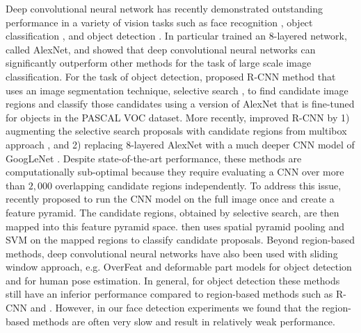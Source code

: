 \documentclass{sig-alternate-2013}
\begin{document}
Deep convolutional neural network has recently demonstrated outstanding performance in a variety of vision tasks such as face recognition \cite{deepface, deepid2}, object classification \cite{alex-net, googlenet}, and object detection \cite{rcnn, overfeat, spp, google_detector}. In particular \cite{alex-net} trained an $8$-layered network, called AlexNet, and showed that deep convolutional neural networks can significantly outperform other methods for the task of large scale image classification. For the task of object detection, \cite{rcnn} proposed R-CNN method that uses an image segmentation technique,  selective search \cite{selective_search}, to find candidate image regions and classify those candidates using a version of AlexNet that is fine-tuned for objects in the PASCAL VOC dataset. More recently, \cite{google_2014} improved R-CNN by 1) augmenting the selective search proposals with candidate regions from multibox approach \cite{multi_box}, and 2) replacing 8-layered AlexNet with a much deeper CNN model of GoogLeNet \cite{googlenet}. Despite state-of-the-art performance, these methods are computationally sub-optimal because they require evaluating a CNN over more than $2,000$ overlapping candidate regions independently. To address this issue, \cite{spp} recently proposed to run the CNN model on the full image once and create a feature pyramid. The candidate regions, obtained by selective search, are then mapped into this feature pyramid space. \cite{spp} then uses spatial pyramid pooling \cite{spatial_pyramid_pooling} and SVM on the mapped regions to classify candidate proposals. Beyond region-based methods, deep convolutional neural networks have also been used with sliding window approach, e.g. OverFeat \cite{overfeat} and  deformable part models \cite{dense_net_dpm} for object detection and \cite{Tompson14} for human pose estimation. In general, for object detection these methods still have an inferior performance compared to region-based methods such as R-CNN \cite{rcnn} and \cite{google_2014}. However, in our face detection experiments we found that the region-based methods are often very slow and result in relatively weak performance. 
\end{document}
